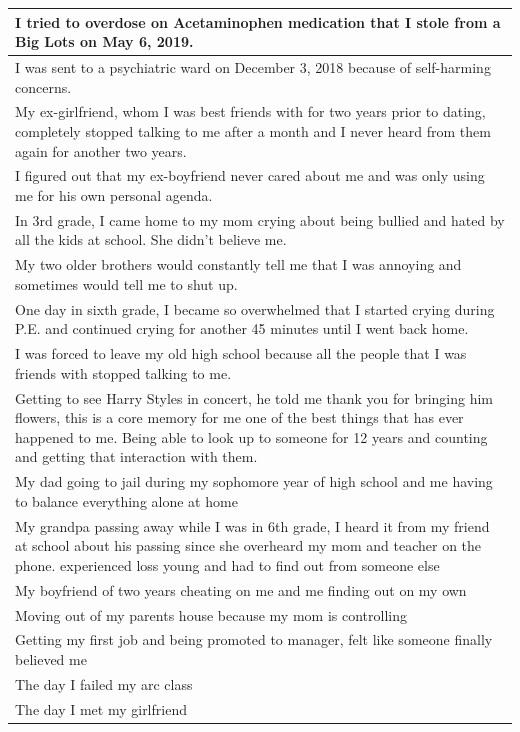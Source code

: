 \documentclass[
  .7em,
  letterpaper,
  DIV=11,
  numbers=noendperiod]{scrartcl}
\begin{document}
\begin{table}
\begin{tabular}{l}
\hline
I tried to overdose on Acetaminophen medication that I stole from a Big Lots on May 6, 2019.\\
\hline
I was sent to a psychiatric ward on December 3, 2018 because of self-harming concerns.\\
\hline
My ex-girlfriend, whom I was best friends with for two years prior to dating, completely stopped talking to me after a month and I never heard from them again for another two years.\\
\hline
I figured out that my ex-boyfriend never cared about me and was only using me for his own personal agenda.\\
\hline
In 3rd grade, I came home to my mom crying about being bullied and hated by all the kids at school. She didn't believe me.\\
\hline
My two older brothers would constantly tell me that I was annoying and sometimes would tell me to shut up.\\
\hline
One day in sixth grade, I became so overwhelmed that I started crying during P.E. and continued crying for another 45 minutes until I went back home.\\
\hline
I was forced to leave my old high school because all the people that I was friends with stopped talking to me.\\
\hline
Getting to see Harry Styles in concert, he told me thank you for bringing him flowers, this is a core memory for me one of the best things that has ever happened to me. Being able to look up to someone for 12 years and counting and getting that interaction with them.\\
\hline
My dad going to jail during my sophomore year of high school and me having to balance everything alone at home\\
\hline
My grandpa passing away while I was in 6th grade, I heard it from my friend at school about his passing since she overheard my mom and teacher on the phone. experienced loss young and had to find out from someone else\\
\hline
My boyfriend of two years cheating on me and me finding out on my own\\
\hline
Moving out of my parents house because my mom is controlling\\
\hline
Getting my first job and being promoted to manager, felt like someone finally believed me\\
\hline
The day I failed my arc class\\
\hline
The day I met my girlfriend\\

\end{tabular}
\end{table}
\end{document}
